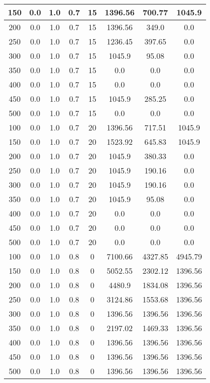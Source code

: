 \documentclass[a4paper, 12pt]{extreport}
\begin{document}
\begin{itemize}
\begin{longtable}{|c|c|c|c|c|c|c|c|}
			150 & 0.0 & 1.0 & 0.7 & 15 & 1396.56 & 700.77 & 1045.9 \\\hline
			200 & 0.0 & 1.0 & 0.7 & 15 & 1396.56 & 349.0 & 0.0 \\\hline
			250 & 0.0 & 1.0 & 0.7 & 15 & 1236.45 & 397.65 & 0.0 \\\hline
			300 & 0.0 & 1.0 & 0.7 & 15 & 1045.9 & 95.08 & 0.0 \\\hline
			350 & 0.0 & 1.0 & 0.7 & 15 & 0.0 & 0.0 & 0.0 \\\hline
			400 & 0.0 & 1.0 & 0.7 & 15 & 0.0 & 0.0 & 0.0 \\\hline
			450 & 0.0 & 1.0 & 0.7 & 15 & 1045.9 & 285.25 & 0.0 \\\hline
			500 & 0.0 & 1.0 & 0.7 & 15 & 0.0 & 0.0 & 0.0 \\\hline
			100 & 0.0 & 1.0 & 0.7 & 20 & 1396.56 & 717.51 & 1045.9 \\\hline
			150 & 0.0 & 1.0 & 0.7 & 20 & 1523.92 & 645.83 & 1045.9 \\\hline
			200 & 0.0 & 1.0 & 0.7 & 20 & 1045.9 & 380.33 & 0.0 \\\hline
			250 & 0.0 & 1.0 & 0.7 & 20 & 1045.9 & 190.16 & 0.0 \\\hline
			300 & 0.0 & 1.0 & 0.7 & 20 & 1045.9 & 190.16 & 0.0 \\\hline
			350 & 0.0 & 1.0 & 0.7 & 20 & 1045.9 & 95.08 & 0.0 \\\hline
			400 & 0.0 & 1.0 & 0.7 & 20 & 0.0 & 0.0 & 0.0 \\\hline
			450 & 0.0 & 1.0 & 0.7 & 20 & 0.0 & 0.0 & 0.0 \\\hline
			500 & 0.0 & 1.0 & 0.7 & 20 & 0.0 & 0.0 & 0.0 \\\hline
			100 & 0.0 & 1.0 & 0.8 & 0 & 7100.66 & 4327.85 & 4945.79 \\\hline
			150 & 0.0 & 1.0 & 0.8 & 0 & 5052.55 & 2302.12 & 1396.56 \\\hline
			200 & 0.0 & 1.0 & 0.8 & 0 & 4480.9 & 1834.08 & 1396.56 \\\hline
			250 & 0.0 & 1.0 & 0.8 & 0 & 3124.86 & 1553.68 & 1396.56 \\\hline
			300 & 0.0 & 1.0 & 0.8 & 0 & 1396.56 & 1396.56 & 1396.56 \\\hline
			350 & 0.0 & 1.0 & 0.8 & 0 & 2197.02 & 1469.33 & 1396.56 \\\hline
			400 & 0.0 & 1.0 & 0.8 & 0 & 1396.56 & 1396.56 & 1396.56 \\\hline
			450 & 0.0 & 1.0 & 0.8 & 0 & 1396.56 & 1396.56 & 1396.56 \\\hline
			500 & 0.0 & 1.0 & 0.8 & 0 & 1396.56 & 1396.56 & 1396.56 \\\hline

\end{longtable}
\end{itemize}
\end{document}
